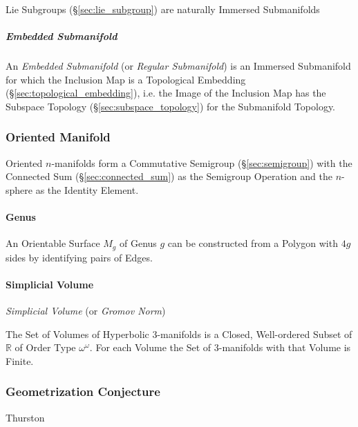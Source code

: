 \fist Lie Subgroups (\S\ref{sec:lie_subgroup}) are naturally Immersed
Submanifolds



\subparagraph{Embedded Submanifold}\label{sec:embedded_submanifold}\hfill

An \emph{Embedded Submanifold} (or \emph{Regular Submanifold}) is an Immersed
Submanifold for which the Inclusion Map is a Topological Embedding
(\S\ref{sec:topological_embedding}), i.e. the Image of the Inclusion Map
has the Subspace Topology (\S\ref{sec:subspace_topology}) for the Submanifold
Topology.



\subsubsection{Oriented Manifold}\label{sec:oriented_manifold}

Oriented $n$-manifolds form a Commutative Semigroup
(\S\ref{sec:semigroup}) with the Connected Sum
(\S\ref{sec:connected_sum}) as the Semigroup Operation and the
$n$-sphere as the Identity Element.



\paragraph{Genus}\label{sec:genus}\hfill

An Orientable Surface $M_g$ of Genus $g$ can be constructed from a
Polygon with $4g$ sides by identifying pairs of Edges.



\paragraph{Simplicial Volume}\label{sec:simplicial_volume}\hfill

\emph{Simplicial Volume} (or \emph{Gromov Norm})

The Set of Volumes of Hyperbolic 3-manifolds is a Closed, Well-ordered
Subset of $\mathbb{R}$ of Order Type $\omega^\omega$. For each Volume
the Set of 3-manifolds with that Volume is Finite.



\subsubsection{Geometrization Conjecture}
\label{sec:geometrization_conjecture}

Thurston



